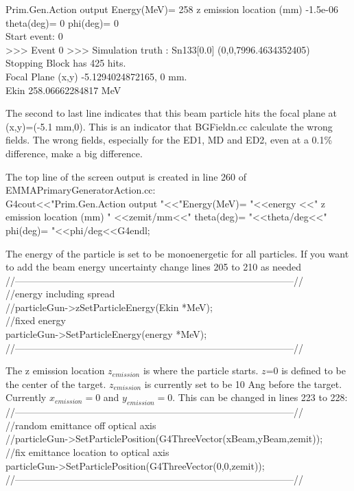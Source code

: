 \documentclass[letter,11pt]{article}
\newcommand{\filefont}[1]{{\scriptsize\ttfamily\selectfont #1}\xspace}
\begin{document}
\filefont{Prim.Gen.Action output Energy(MeV)= 258 z emission location (mm) -1.5e-06 theta(deg)= 0 phi(deg)= 0\\
Start event: 0\\

	>>> Event 0 >>> Simulation truth : Sn133[0.0] (0,0,7996.4634352405)\\
Stopping Block has 425 hits.\\
	Focal Plane (x,y) -5.1294024872165, 0 mm.\\
	Ekin 258.06662284817 MeV\\}
	
The second to last line indicates that this beam particle hits the focal plane at (x,y)=(-5.1 mm,0). This is an indicator that BGFieldn.cc calculate the wrong fields. The wrong fields, especially for the ED1, MD and ED2, even at a 0.1\% difference, make a big difference.

The top line of the screen output is created in line 260 of EMMAPrimaryGeneratorAction.cc:\\
\filefont{    G4cout<<"Prim.Gen.Action output "<<"Energy(MeV)= "<<energy <<" z emission location (mm) "
          <<zemit/mm<<" theta(deg)= "<<theta/deg<<" phi(deg)= "<<phi/deg<<G4endl;}


The energy of the particle is set to be monoenergetic for all particles. If you want to add the beam energy uncertainty change lines 205 to 210 as needed\\
\filefont{//---------------------------------------------------------------------------------------//\\
    //energy including spread\\
    //particleGun->zSetParticleEnergy(Ekin *MeV);\\
    //fixed energy\\
    particleGun->SetParticleEnergy(energy *MeV);\\
//---------------------------------------------------------------------------------------//\\}

The z emission location $z_{emission}$ is where the particle starts. $z$=0 is defined to be the center of the target. $z_{emission}$ is currently set to be 10 Ang before the target. Currently $x_{emission}=0$ and $y_{emission}=0$. This can be changed in lines 223 to 228:\\
\filefont{//---------------------------------------------------------------------------------------//\\
    //random emittance off optical axis\\
    //particleGun->SetParticlePosition(G4ThreeVector(xBeam,yBeam,zemit));\\
    //fix emittance location to optical axis\\
    particleGun->SetParticlePosition(G4ThreeVector(0,0,zemit));\\
//---------------------------------------------------------------------------------------//\\}
\end{document}
